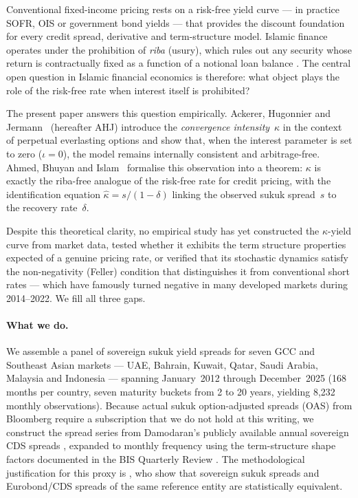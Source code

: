 \documentclass[12pt]{article}
\theoremstyle{plain}
\theoremstyle{definition}
\theoremstyle{remark}
\begin{document}
Conventional fixed-income pricing rests on a risk-free yield curve --- in
practice SOFR, OIS or government bond yields --- that provides the discount
foundation for every credit spread, derivative and term-structure model.
Islamic finance operates under the prohibition of \emph{riba} (usury), which
rules out any security whose return is contractually fixed as a function of a
notional loan balance \citep{Jobst2007}. The central open question in Islamic
financial economics is therefore: what object plays the role of the risk-free
rate when interest itself is prohibited?

The present paper answers this question empirically. Ackerer, Hugonnier and
Jermann~\cite{Ackerer2024} (hereafter AHJ) introduce the \emph{convergence
intensity}~$\kappa$ in the context of perpetual everlasting options and show
that, when the interest parameter is set to zero ($\iota = 0$), the
model remains internally consistent and arbitrage-free. Ahmed, Bhuyan and
Islam~\cite{AhmedBhuyanIslam2026} formalise this observation into a theorem:
$\kappa$ is exactly the riba-free analogue of the risk-free rate for credit
pricing, with the identification equation
$\hat{\kappa} = s/(1-\delta)$
linking the observed sukuk spread~$s$ to the recovery rate~$\delta$.

Despite this theoretical clarity, no empirical study has yet constructed the
$\kappa$-yield curve from market data, tested whether it exhibits the term
structure properties expected of a genuine pricing rate, or verified that its
stochastic dynamics satisfy the non-negativity (Feller) condition that
distinguishes it from conventional short rates --- which have famously turned
negative in many developed markets during 2014--2022. We fill all three gaps.

\paragraph{What we do.}
We assemble a panel of sovereign sukuk yield spreads for seven GCC and
Southeast Asian markets --- UAE, Bahrain, Kuwait, Qatar, Saudi Arabia,
Malaysia and Indonesia --- spanning January~2012 through December~2025 (168
months per country, seven maturity buckets from 2 to 20 years, yielding 8,232
monthly observations). Because actual sukuk option-adjusted spreads (OAS) from
Bloomberg require a subscription that we do not hold at this writing, we
construct the spread series from Damodaran's publicly available annual sovereign
CDS spreads \citep{Damodaran2026}, expanded to monthly frequency using the
term-structure shape factors documented in the BIS Quarterly Review
\citep{BIS2022}. The methodological justification for this proxy is
\citet{CakırRaei2007}, who show that sovereign sukuk spreads and Eurobond/CDS
spreads of the same reference entity are statistically equivalent.
\end{document}
